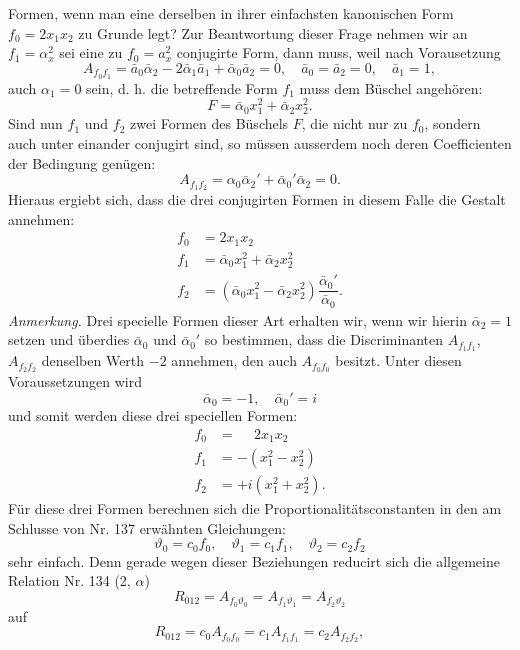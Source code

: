 \documentclass[11pt]{article}
\providecommand{\weberpage}[1]{}
\begin{document}
\weberpage{157}
Formen, wenn man eine derselben in ihrer einfachsten kanonischen
Form $f_0 = 2x_1x_2$ zu Grunde legt? Zur Beantwortung dieser Frage
nehmen wir an $f_1 = \alpha_x^2$ sei eine zu $f_0 = a_x^2$ conjugirte Form, dann
muss, weil nach Vorausetzung %
\[
A_{f_0f_1} = \bar a_0\bar\alpha_2 - 2\bar\alpha_1\bar a_1 + \bar\alpha_0\bar a_2 = 0, \quad \bar a_0 = \bar a_2 = 0, \quad \bar a_1 = 1,
\]
auch $\alpha_1 = 0$ sein, d. h. die betreffende Form $f_1$ muss dem Büschel
angehören:
\[
F = \bar\alpha_0 x_1^2 + \bar\alpha_2 x_2^2.
\]
Sind nun $f_1$ und $f_2$ zwei Formen des Büschels $F$, die nicht nur zu $f_0$,
sondern auch unter einander conjugirt sind, so müssen ausserdem noch
deren Coefficienten der Bedingung genügen:
\[
A_{f_1f_2} = \alpha_0\bar\alpha_2' + \bar\alpha_0'\bar\alpha_2 = 0.
\]
Hieraus ergiebt sich, dass die drei conjugirten Formen in diesem Falle
die Gestalt annehmen:
\[
\begin{aligned}
f_0 &= 2x_1x_2 \\
f_1 &= \bar\alpha_0 x_1^2 + \bar\alpha_2 x_2^2 \\
f_2 &= (\bar\alpha_0 x_1^2 - \bar\alpha_2 x_2^2)\dfrac{\bar\alpha_0'}{\bar\alpha_0}.
\end{aligned}
\]
\textit{Anmerkung.} Drei specielle Formen dieser Art erhalten wir, wenn
wir hierin $\bar\alpha_2 = 1$ setzen und überdies $\bar\alpha_0$ und $\bar\alpha_0'$ so bestimmen, dass
die Discriminanten $A_{f_1f_1}$, $A_{f_2f_2}$ denselben Werth $-2$ annehmen, den
auch $A_{f_0f_0}$ besitzt. Unter diesen Voraussetzungen wird
\[
\bar\alpha_0 = -1, \quad \bar\alpha_0' = i
\]
und somit werden diese drei speciellen Formen:
\[
\begin{aligned}
f_0 &= \phantom{-}2x_1x_2 \\
f_1 &= -(x_1^2 - x_2^2) \\
f_2 &= +i(x_1^2 + x_2^2).
\end{aligned}
\]
Für diese drei Formen berechnen sich die Proportionalitätsconstanten
in den am Schlusse von Nr. 137 erwähnten Gleichungen:
\[
\vartheta_0 = c_0f_0, \quad \vartheta_1 = c_1f_1, \quad \vartheta_2 = c_2f_2
\]
sehr einfach. Denn gerade wegen dieser Beziehungen reducirt sich
die allgemeine Relation Nr. 134 (2, $\alpha$)
\[
R_{012} = A_{f_0\vartheta_0} = A_{f_1\vartheta_1} = A_{f_2\vartheta_2}
\]
auf
\[
R_{012} = c_0A_{f_0f_0} = c_1A_{f_1f_1} = c_2A_{f_2f_2},
\]
\end{document}

